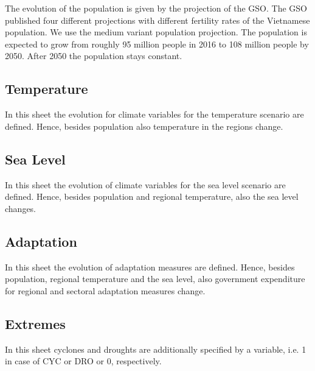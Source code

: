 \documentclass[10pt,a4paper]{article}
\begin{document}
 
 The evolution of the population is given by the projection of the GSO. The GSO published four different projections with different fertility rates of the Vietnamese population. We use the medium  variant population projection. The population is expected to grow from roughly 95 million people in  2016 to 108 million people by 2050. After 2050 the population stays constant.

 
\subsection{Temperature}
In this sheet the evolution for climate variables for the temperature scenario are defined. Hence, besides population also temperature in the regions change.
 
\subsection{Sea Level}
In this sheet the evolution of climate variables for the sea level scenario are defined. Hence, besides population and regional temperature, also the sea level changes.
 
\subsection{Adaptation}
In this sheet the evolution of adaptation measures are defined. Hence, besides population, regional temperature and the sea level, also government expenditure for regional and sectoral adaptation measures change.
  
  
\subsection{Extremes}
In this sheet cyclones and droughts are additionally specified by a variable, i.e. 1 in case of CYC or DRO or 0, respectively.
    
\end{document}
